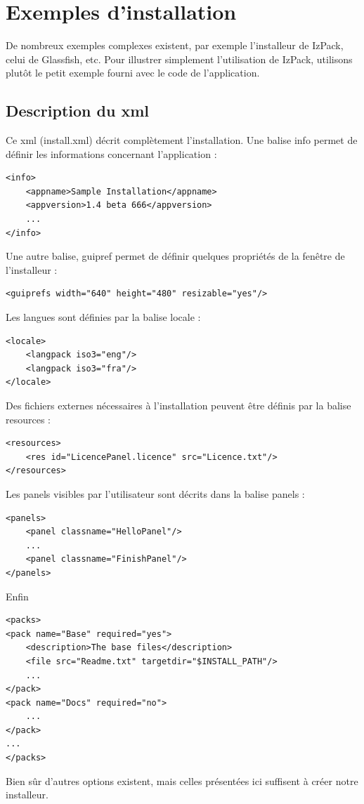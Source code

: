 \section{Exemples d'installation}
De nombreux exemples complexes existent, par exemple l'installeur de IzPack, celui de Glassfish, etc. Pour illustrer simplement l'utilisation de IzPack, utilisons plutôt le petit exemple fourni avec le code de l'application.

\subsection{Description du xml}


Ce xml (install.xml) décrit complètement l'installation.
Une balise info permet de définir les informations concernant l'application : 
\begin{lstlisting}
<info>
	<appname>Sample Installation</appname>
	<appversion>1.4 beta 666</appversion>
	...
</info>
\end{lstlisting}
Une autre balise, guipref permet de définir quelques propriétés de la fenêtre de l'installeur :
\begin{lstlisting}
<guiprefs width="640" height="480" resizable="yes"/>
\end{lstlisting}
Les langues sont définies par la balise locale :
\begin{lstlisting}
<locale>
	<langpack iso3="eng"/>
	<langpack iso3="fra"/>
</locale>
\end{lstlisting}
Des fichiers externes nécessaires à l'installation peuvent être définis par la balise resources :

\begin{lstlisting}
<resources>
	<res id="LicencePanel.licence" src="Licence.txt"/>
</resources>
\end{lstlisting}
Les panels visibles par l'utilisateur sont décrits dans la balise panels :
\begin{lstlisting}
<panels>
	<panel classname="HelloPanel"/>
	...
	<panel classname="FinishPanel"/>
</panels>
\end{lstlisting}
Enfin 
\begin{lstlisting}
<packs>
<pack name="Base" required="yes">
	<description>The base files</description>
	<file src="Readme.txt" targetdir="$INSTALL_PATH"/>
	...
</pack>
<pack name="Docs" required="no">
	...
</pack>
...
</packs>
\end{lstlisting}
Bien sûr d'autres options existent, mais celles présentées ici suffisent à créer notre installeur.
